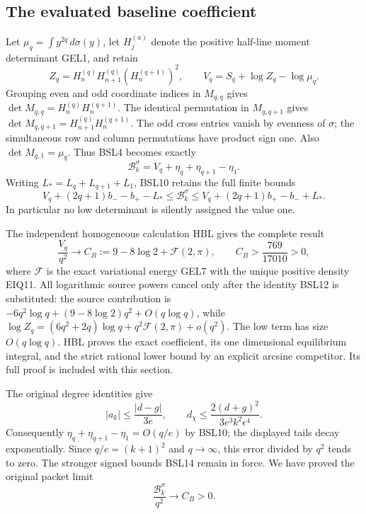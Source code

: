 \documentclass[11pt,a4paper]{article}
\begin{document}
\subsection{The evaluated baseline coefficient}
Let $\mu_q=\int y^{2q}\,d\sigma(y)$, let $H_j^{(a)}$ denote the
positive half-line moment determinant GEL1, and retain
\[
 Z_q=H_n^{(q)}H_{n+1}^{(q)}(H_n^{(q+1)})^2,
 \qquad V_q=S_q+\log Z_q-\log\mu_q.
 \tag{BSL12}
\]
Grouping even and odd coordinate indices in $M_{q,q}$ gives
$\det M_{q,q}=H_n^{(q)}H_n^{(q+1)}$.
The identical permutation in $M_{q,q+1}$ gives
$\det M_{q,q+1}=H_{n+1}^{(q)}H_n^{(q+1)}$.
The odd cross entries vanish by evenness of $\sigma$; the simultaneous
row and column permutations have product sign one. Also
$\det M_{q,1}=\mu_q$. Thus BSL4 becomes exactly
\[
 \boxed{\mathcal B_k^\sigma=V_q+\eta_q+\eta_{q+1}-\eta_1.}
 \tag{BSL13}
\]
Writing $L_*=L_q+L_{q+1}+L_1$, BSL10 retains the full finite bounds
\[
 \boxed{V_q+(2q+1)b_- -b_+-L_*
       \leq\mathcal B_k^\sigma
       \leq V_q+(2q+1)b_+-b_-+L_*.}
 \tag{BSL14}
\]
In particular no low determinant is silently assigned the value one.

The independent homogeneous calculation HBL gives the complete result
\[
 \frac{V_q}{q^2}\longrightarrow C_B
 :=9-8\log2+\mathcal F(2,\pi),\qquad
 C_B>\frac{769}{17010}>0,
 \tag{BSL15}
\]
where $\mathcal F$ is the exact variational energy GEL7 with the
unique positive density EIQ11. All logarithmic source powers cancel
only after the identity BSL12 is substituted: the source contribution
is $-6q^2\log q+(9-8\log2)q^2+O(q\log q)$, while
$\log Z_q=(6q^2+2q)\log q+q^2\mathcal F(2,\pi)+o(q^2)$.
The low term has size $O(q\log q)$. HBL proves the exact coefficient,
its one dimensional equilibrium integral, and the strict rational
lower bound by an explicit arcsine competitor. Its full proof is
included with this section.

The original degree identities give
\[
 |a_k|\leq\frac{|d-g|}{3e},\qquad
 d_\chi\leq\frac{2(d+g)^2}{3e^3k^2\epsilon^4}.
\]
Consequently $\eta_q+\eta_{q+1}-\eta_1=O(q/e)$ by BSL10;
the displayed tails decay exponentially. Since $q/e=(k+1)^2$
and $q\to\infty$, this error divided by $q^2$ tends to zero.
The stronger signed bounds BSL14 remain in force. We have proved
the original packet limit
\[
 \boxed{\frac{\mathcal B_k^\sigma}{q^2}\longrightarrow C_B>0.}
 \tag{BSL16}
\]
\end{document}

